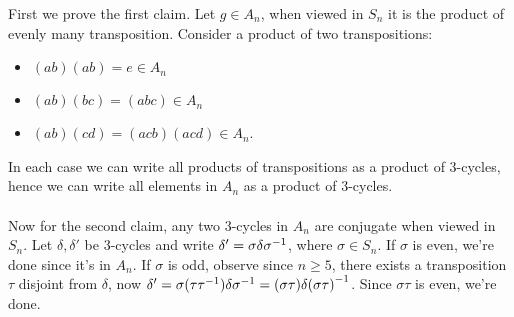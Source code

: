 \documentclass{article}
\newcommand{\nrm}{\triangleleft}
\begin{document}
First we prove the first claim. Let $ g\in A_n $, when viewed in $ S_n $ it is the product of evenly many transposition. Consider a product of two transpositions:
\begin{itemize}
	\item $ (ab)(ab)=e\in A_n $
	\item $ (ab)(bc)=(abc)\in A_n $
	\item $ (ab)(cd)=(acb)(acd)\in A_n $.
\end{itemize}
In each case we can write all products of transpositions as a product of 3-cycles, hence we can write all elements in $ A_n $ as a product of 3-cycles.\\\\
Now for the second claim, any two 3-cycles in $ A_n $ are conjugate when viewed in $ S_n $. Let $ \delta, \delta' $ be 3-cycles and write $ \delta' =\sigma\delta{\sigma}^{-1} $, where $ \sigma\in S_n $. If $ \sigma $ is even, we're done since it's in $ A_n $. If $ \sigma $ is odd, observe since $ n\ge 5 $, there exists a transposition $ \tau $ disjoint from $ \delta $, now $ \delta'=\sigma(\tau{\tau}^{-1})\delta{\sigma}^{-1}=(\sigma\tau)\delta{(\sigma\tau)}^{-1} $. Since $ \sigma\tau $ is even, we're done.
\end{document}
